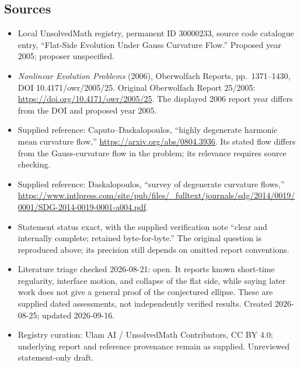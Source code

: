 \documentclass[11pt]{article}
\begin{document}
\subsection{Sources}
\begin{itemize}
\item Local UnsolvedMath registry, permanent ID 30000233, source code catalogue entry, ``Flat-Side Evolution Under Gauss Curvature Flow.'' Proposed year 2005; proposer unspecified.
\item \emph{Nonlinear Evolution Problems} (2006), Oberwolfach Reports, pp.\ 1371--1430, DOI 10.4171/owr/2005/25. Original Oberwolfach Report 25/2005: \url{https://doi.org/10.4171/owr/2005/25}. The displayed 2006 report year differs from the DOI and proposed year 2005.
\item Supplied reference: Caputo--Daskalopoulos, ``highly degenerate harmonic mean curvature flow,'' \url{https://arxiv.org/abs/0804.3936}. Its stated flow differs from the Gauss-curvature flow in the problem; its relevance requires source checking.
\item Supplied reference: Daskalopoulos, ``survey of degenerate curvature flows,'' \url{https://www.intlpress.com/site/pub/files/_fulltext/journals/sdg/2014/0019/0001/SDG-2014-0019-0001-a004.pdf}.
\item Statement status exact, with the supplied verification note ``clear and internally complete; retained byte-for-byte.'' The original question is reproduced above; its precision still depends on omitted report conventions.
\item Literature triage checked 2026-08-21: open. It reports known short-time regularity, interface motion, and collapse of the flat side, while saying later work does not give a general proof of the conjectured ellipse. These are supplied dated assessments, not independently verified results. Created 2026-08-25; updated 2026-09-16.
\item Registry curation: Ulam AI / UnsolvedMath Contributors, CC BY 4.0; underlying report and reference provenance remain as supplied. Unreviewed statement-only draft.
\end{itemize}
\end{document}
